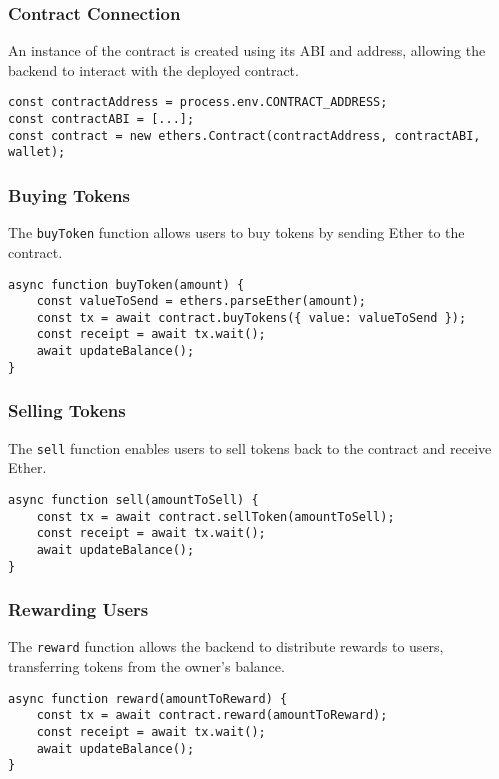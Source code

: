 \documentclass[../main.tex]{subfiles}
\begin{document}
\subsubsection{Contract Connection}
An instance of the contract is created using its ABI and address, allowing the backend to interact with the deployed contract.

\begin{verbatim}
const contractAddress = process.env.CONTRACT_ADDRESS;
const contractABI = [...];
const contract = new ethers.Contract(contractAddress, contractABI, wallet);
\end{verbatim}

\subsubsection{Buying Tokens}
The \texttt{buyToken} function allows users to buy tokens by sending Ether to the contract.

\begin{verbatim}
async function buyToken(amount) {
    const valueToSend = ethers.parseEther(amount);
    const tx = await contract.buyTokens({ value: valueToSend });
    const receipt = await tx.wait();
    await updateBalance();
}
\end{verbatim}

\subsubsection{Selling Tokens}
The \texttt{sell} function enables users to sell tokens back to the contract and receive Ether.

\begin{verbatim}
async function sell(amountToSell) {
    const tx = await contract.sellToken(amountToSell);
    const receipt = await tx.wait();
    await updateBalance();
}
\end{verbatim}

\subsubsection{Rewarding Users}
The \texttt{reward} function allows the backend to distribute rewards to users, transferring tokens from the owner’s balance.

\begin{verbatim}
async function reward(amountToReward) {
    const tx = await contract.reward(amountToReward);
    const receipt = await tx.wait();
    await updateBalance();
}
\end{verbatim}
\end{document}
